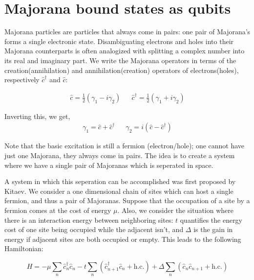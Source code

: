 \section{Majorana bound states as qubits}

	Majorana particles are particles that always come in pairs: one pair of Majorana's forms a single electronic state.
	Disambiguating electrons and holes into their Majorana counterparts is often analogized with splitting a complex number into its real and imaginary part.
	We write the Majorana operators in terms of the creation(annihilation) and annihilation(creation) operators of electrons(holes), respectively $\hat{c}^\dagger$ and $\hat{c}$:

	\begin{align}
		\hat{c} =  \frac{1}{2} \left( \gamma_1 - i\gamma_2 \right) && \hat{c}^\dagger = \frac{1}{2} \left( \gamma_1 + i\gamma_2 \right)
		\label{eq:intro_ferm2maj}
	\end{align}

	Inverting this, we get,
	\begin{align}
		\gamma_1 = \hat{c} + \hat{c}^\dagger && \gamma_2 = i \left( \hat{c} - \hat{c}^\dagger \right)
		\label{eq:intro_maj2ferm}
	\end{align}

	Note that the basic excitation is still a fermion (electron/hole); one cannot have just one Majorana, they always come in pairs.
	The idea is to create a system where we have a single pair of Majoranas which is seperated in space.

	A system in which this seperation can be accomplished was first proposed by Kitaev\cite{kitaev_unpaired_2001}.
	We consider a one dimensional chain of sites which can host a single fermion, and thus a pair of Majoranas.
	Suppose that the occupation of a site by a fermion comes at the cost of energy $\mu$.
	Also, we consider the situation where there is an interaction energy between neighboring sites: $t$ quantifies the energy cost of one site being occupied while the adjacent isn't, and $\Delta$ is the gain in energy if adjacent sites are both occupied or empty.
	This leads to the following Hamiltonian:

	\begin{equation}
		H = -\mu \sum_n \hat{c}_n^\dagger \hat{c}_n
		- t \sum_n \left( \hat{c}_{n+1}^\dagger \hat{c}_n +\text{h.c.} \right) 
		+ \Delta \sum_n \left( \hat{c}_n \hat{c}_{n+1} +\text{h.c.} \right) 
	\end{equation}

